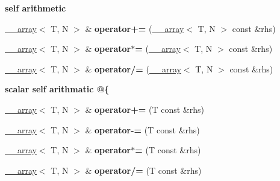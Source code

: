 \begin{Indent}{\bf self arithmetic}\par
{\em \label{_amgrp44a004ce72e494ebc4afe892ebb473f0}
 }\begin{DoxyCompactItemize}
\item 
\hypertarget{class____array_a1fdacdb2b2a79effe9a11121648a3f44}{
\hyperlink{class____array}{\_\-\_\-array}$<$ T, N $>$ \& {\bfseries operator+=} (\hyperlink{class____array}{\_\-\_\-array}$<$ T, N $>$ const \&rhs)}
\label{class____array_a1fdacdb2b2a79effe9a11121648a3f44}

\item 
\hypertarget{class____array_a5b698b219ec8e62bab83528564caa579}{
\hyperlink{class____array}{\_\-\_\-array}$<$ T, N $>$ \& {\bfseries operator$\ast$=} (\hyperlink{class____array}{\_\-\_\-array}$<$ T, N $>$ const \&rhs)}
\label{class____array_a5b698b219ec8e62bab83528564caa579}

\item 
\hypertarget{class____array_af812f20cd83b4f54cb4b0e780ed07b11}{
\hyperlink{class____array}{\_\-\_\-array}$<$ T, N $>$ \& {\bfseries operator/=} (\hyperlink{class____array}{\_\-\_\-array}$<$ T, N $>$ const \&rhs)}
\label{class____array_af812f20cd83b4f54cb4b0e780ed07b11}

\end{DoxyCompactItemize}
\end{Indent}
\begin{Indent}{\bf scalar self arithmatic @\{}\par
{\em \label{_amgrp7095cbd4de7cb27ceb837c23324bbb90}
 }\begin{DoxyCompactItemize}
\item 
\hypertarget{class____array_ab7e070d91093ec916a8f53724aa4e878}{
\hyperlink{class____array}{\_\-\_\-array}$<$ T, N $>$ \& {\bfseries operator+=} (T const \&rhs)}
\label{class____array_ab7e070d91093ec916a8f53724aa4e878}

\item 
\hypertarget{class____array_a551523046f30647b3591776040c64c50}{
\hyperlink{class____array}{\_\-\_\-array}$<$ T, N $>$ \& {\bfseries operator-\/=} (T const \&rhs)}
\label{class____array_a551523046f30647b3591776040c64c50}

\item 
\hypertarget{class____array_abf242f49019b906d3f846fc185cc38ae}{
\hyperlink{class____array}{\_\-\_\-array}$<$ T, N $>$ \& {\bfseries operator$\ast$=} (T const \&rhs)}
\label{class____array_abf242f49019b906d3f846fc185cc38ae}

\item 
\hypertarget{class____array_ad0a349749a91dc7379c626dc13b6f26c}{
\hyperlink{class____array}{\_\-\_\-array}$<$ T, N $>$ \& {\bfseries operator/=} (T const \&rhs)}
\label{class____array_ad0a349749a91dc7379c626dc13b6f26c}

\end{DoxyCompactItemize}
\end{Indent}
